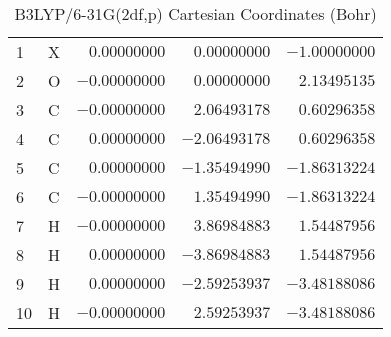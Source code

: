 \documentclass[10pt,oneside]{article}
\begin{document}
\begin{table}[h!]
\centering
\caption{B3LYP/6-31G(2df,p) Cartesian Coordinates (Bohr)}
\begin{tabular}{llrrr}
1  & X  & $ 0.00000000$ & $ 0.00000000$ & $-1.00000000$ \\
2  & O  & $-0.00000000$ & $ 0.00000000$ & $ 2.13495135$ \\
3  & C  & $-0.00000000$ & $ 2.06493178$ & $ 0.60296358$ \\
4  & C  & $ 0.00000000$ & $-2.06493178$ & $ 0.60296358$ \\
5  & C  & $ 0.00000000$ & $-1.35494990$ & $-1.86313224$ \\
6  & C  & $-0.00000000$ & $ 1.35494990$ & $-1.86313224$ \\
7  & H  & $-0.00000000$ & $ 3.86984883$ & $ 1.54487956$ \\
8  & H  & $ 0.00000000$ & $-3.86984883$ & $ 1.54487956$ \\
9  & H  & $ 0.00000000$ & $-2.59253937$ & $-3.48188086$ \\
10 & H  & $-0.00000000$ & $ 2.59253937$ & $-3.48188086$ \\
\end{tabular}
\end{table}

\clearpage
\end{document}
